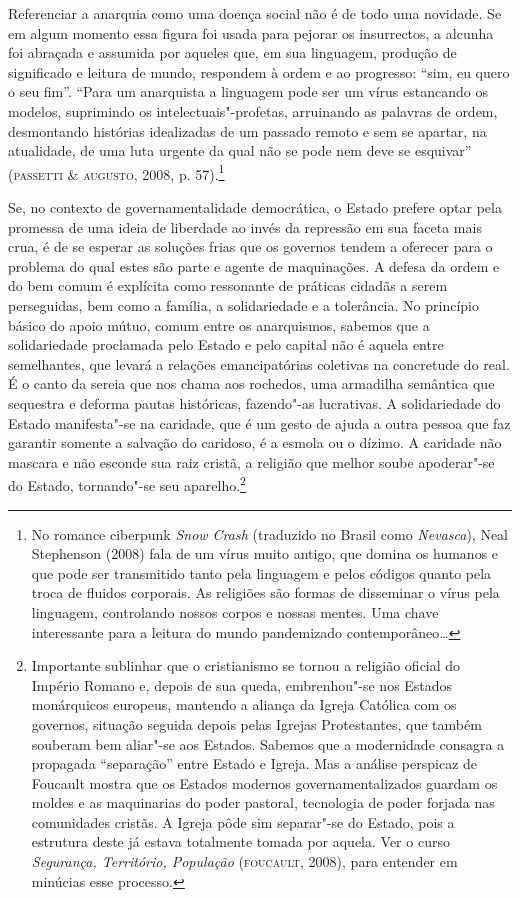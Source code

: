Referenciar a anarquia como uma doença social não é de todo uma
novidade. Se em algum momento essa figura foi usada para pejorar os
insurrectos, a alcunha foi abraçada e assumida por aqueles que, em sua
linguagem, produção de significado e leitura de mundo, respondem à ordem
e ao progresso: ``sim, eu quero o seu fim''. ``Para um anarquista a
linguagem pode ser um vírus estancando os modelos, suprimindo os
intelectuais"-profetas, arruinando as palavras de ordem, desmontando
histórias idealizadas de um passado remoto e sem se apartar, na
atualidade, de uma luta urgente da qual não se pode nem deve se
esquivar'' (\textsc{passetti} \& \textsc{augusto}, 2008, p. 57).\footnote{No romance
  ciberpunk \emph{Snow Crash} (traduzido no Brasil como \emph{Nevasca}),
  Neal Stephenson (2008) fala de um vírus muito antigo, que domina os
  humanos e que pode ser transmitido tanto pela linguagem e pelos
  códigos quanto pela troca de fluidos corporais. As religiões são
  formas de disseminar o vírus pela linguagem, controlando nossos corpos
  e nossas mentes. Uma chave interessante para a leitura do mundo
  pandemizado contemporâneo\ldots{}}

Se, no contexto de governamentalidade democrática, o Estado prefere
optar pela promessa de uma ideia de liberdade ao invés da repressão em
sua faceta mais crua, é de se esperar as soluções frias que os governos
tendem a oferecer para o problema do qual estes são parte e agente de
maquinações. A defesa da ordem e do bem comum é explícita como
ressonante de práticas cidadãs a serem perseguidas, bem como a família,
a solidariedade e a tolerância. No princípio básico do apoio mútuo,
comum entre os anarquismos, sabemos que a solidariedade proclamada pelo
Estado e pelo capital não é aquela entre semelhantes, que levará a
relações emancipatórias coletivas na concretude do real. É o canto da
sereia que nos chama aos rochedos, uma armadilha semântica que sequestra
e deforma pautas históricas, fazendo"-as lucrativas. A solidariedade do
Estado manifesta"-se na caridade, que é um gesto de ajuda a outra pessoa
que faz garantir somente a salvação do caridoso, é a esmola ou o dízimo.
A caridade não mascara e não esconde sua raiz cristã, a religião que
melhor soube apoderar"-se do Estado, tornando"-se seu aparelho.\footnote{Importante
  sublinhar que o cristianismo se tornou a religião oficial do Império
  Romano e, depois de sua queda, embrenhou"-se nos Estados monárquicos
  europeus, mantendo a aliança da Igreja Católica com os governos,
  situação seguida depois pelas Igrejas Protestantes, que também
  souberam bem aliar"-se aos Estados. Sabemos que a modernidade consagra
  a propagada ``separação'' entre Estado e Igreja. Mas a análise
  perspicaz de Foucault mostra que os Estados modernos
  governamentalizados guardam os moldes e as maquinarias do poder
  pastoral, tecnologia de poder forjada nas comunidades cristãs. A
  Igreja pôde sim separar"-se do Estado, pois a estrutura deste já estava
  totalmente tomada por aquela. Ver o curso \emph{Segurança, Território,
  População} (\textsc{foucault}, 2008), para entender em minúcias esse processo.}

